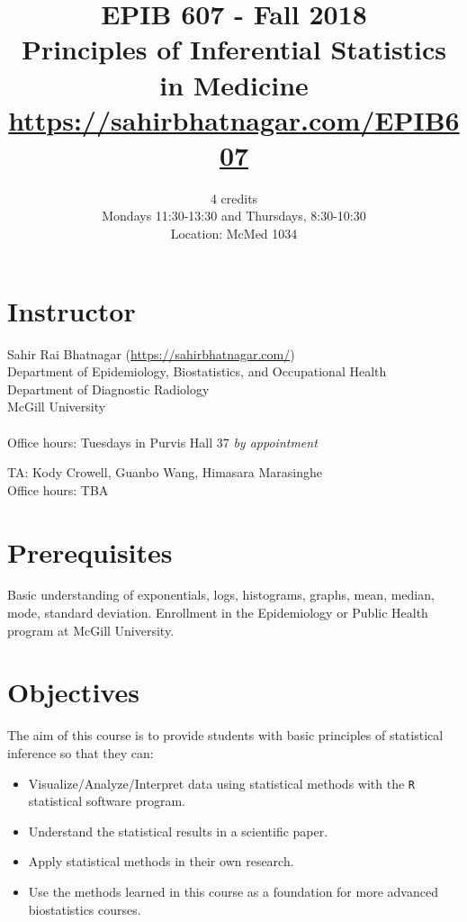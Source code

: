 \documentclass[]{article}
\title{EPIB 607 - Fall 2018\\Principles of Inferential Statistics in Medicine\\\url{https://sahirbhatnagar.com/EPIB607}}
\author{4 credits\\Mondays 11:30-13:30 and Thursdays, 8:30-10:30\\
Location: McMed 1034}
\date{}
\begin{document}
\maketitle

\section{Instructor}
Sahir Rai Bhatnagar (\url{https://sahirbhatnagar.com/}) \\
Department of Epidemiology, Biostatistics, and Occupational Health\\
Department of Diagnostic Radiology\\
McGill University\\
\href{mailto:sahir.bhatnagar@mcgill.ca}{\color{blue}{sahir.bhatnagar@mcgill.ca}}\\
Office hours: Tuesdays in Purvis Hall 37 \textit{by appointment}

\vspace{0.40cm}

\noindent TA: Kody Crowell, Guanbo Wang, Himasara Marasinghe  \\
Office hours: TBA



\section{Prerequisites}
Basic understanding of exponentials, logs, histograms, graphs, mean, median, mode, standard deviation. Enrollment in the Epidemiology or Public Health program at McGill University.

\section{Objectives}
The aim of this course is to provide students with basic principles of statistical inference so that they can:

\begin{itemize}
\item Visualize/Analyze/Interpret data using statistical methods with the \texttt{R} statistical software program.
\item Understand the statistical results in a scientific paper.
\item Apply statistical methods in their own research.
\item Use the methods learned in this course as a foundation for more advanced biostatistics courses.
\end{itemize}
\end{document}
